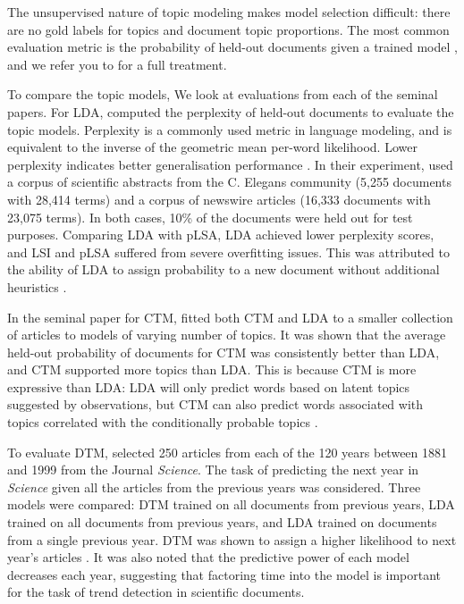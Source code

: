 \documentclass[letterpaper]{article}
\begin{document}
The unsupervised nature of topic modeling makes model selection
difficult: there are no gold labels for topics and document topic
proportions. The most common evaluation metric is the probability of
held-out documents given a trained model \cite{wallach2009evaluation},
and we refer you to \citeauthor{wallach2009evaluation} for a full
treatment.

To compare the topic models, We look at evaluations from each of the
seminal papers. For LDA, \citeauthor{blei2003latent} computed the
perplexity of held-out documents to evaluate the topic models.
Perplexity is a commonly used metric in language modeling, and is
equivalent to the inverse of the geometric mean per-word likelihood.
Lower perplexity indicates better generalisation performance
\cite{blei2003latent}. In their experiment,
\citeauthor{blei2003latent} used a corpus of scientific abstracts from
the C. Elegans community (5,255 documents with 28,414 terms) and a
corpus of newswire articles (16,333 documents with 23,075 terms). In
both cases, 10\% of the documents were held out for test purposes.
Comparing LDA with pLSA, LDA achieved lower perplexity scores, and LSI
and pLSA suffered from severe overfitting issues. This was attributed
to the ability of LDA to assign probability to a new document without
additional heuristics \cite{blei2003latent}.

In the seminal paper for CTM, \citeauthor{blei2005correlated} fitted
both CTM and LDA to a smaller collection of articles to models of
varying number of topics. It was shown that the average held-out
probability of documents for CTM was consistently better than LDA, and
CTM supported more topics than LDA. This is because CTM is more
expressive than LDA: LDA will only predict words based on latent
topics suggested by observations, but CTM can also predict words
associated with topics correlated with the conditionally probable
topics \cite{blei2005correlated}.

To evaluate DTM, \citeauthor{blei2006dynamic} selected 250 articles
from each of the 120 years between 1881 and 1999 from the Journal
\textit{Science}. The task of predicting the next year in
\textit{Science} given all the articles from the previous years was
considered. Three models were compared: DTM trained on all documents
from previous years, LDA trained on all documents from previous years,
and LDA trained on documents from a single previous year. DTM was
shown to assign a higher likelihood to next year's articles
\cite{blei2006dynamic}. It was also noted that the predictive power of
each model decreases each year, suggesting that factoring time into
the model is important for the task of trend detection in scientific
documents.
\end{document}
